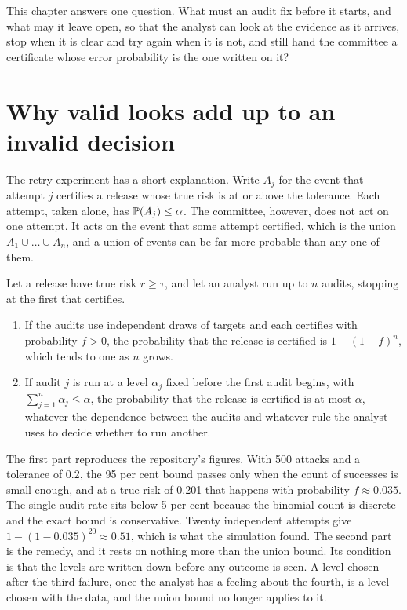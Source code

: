 This chapter answers one question. What must an audit fix before it starts, and
what may it leave open, so that the analyst can look at the evidence as it arrives,
stop when it is clear and try again when it is not, and still hand the committee a
certificate whose error probability is the one written on it?

\section{Why valid looks add up to an invalid decision}\label{c06:sec-retry}

The retry experiment has a short explanation. Write $A_j$ for the event that
attempt $j$ certifies a release whose true risk is at or above the tolerance. Each
attempt, taken alone, has $\mathbb{P}(A_j) \le \alpha$. The committee, however, does not
act on one attempt. It acts on the event that some attempt certified, which is the
union $A_1 \cup \dots \cup A_n$, and a union of events can be far more probable
than any one of them.

\begin{proposition}\label{c06:prop-retry}
Let a release have true risk $r \ge \tau$, and let an analyst run up to $n$ audits,
stopping at the first that certifies.
\begin{enumerate}
\item If the audits use independent draws of targets and each certifies with
probability $f > 0$, the probability that the release is certified is
$1 - (1-f)^n$, which tends to one as $n$ grows.
\item If audit $j$ is run at a level $\alpha_j$ fixed before the first audit begins,
with $\sum_{j=1}^n \alpha_j \le \alpha$, the probability that the release is
certified is at most $\alpha$, whatever the dependence between the audits and
whatever rule the analyst uses to decide whether to run another.
\end{enumerate}
\end{proposition}

The first part reproduces the repository's figures. With 500 attacks and a
tolerance of 0.2, the 95 per cent bound passes only when the count of successes is
small enough, and at a true risk of 0.201 that happens with probability $f \approx
0.035$. The single-audit rate sits below 5 per cent because the binomial count is
discrete and the exact bound is conservative. Twenty independent attempts give
$1 - (1-0.035)^{20} \approx 0.51$, which is what the simulation found.
The second part is the remedy, and it rests on nothing more than the union bound.
Its condition is that the levels are written down before any outcome is seen. A
level chosen after the third failure, once the analyst has a feeling about the
fourth, is a level chosen with the data, and the union bound no longer applies to
it.

